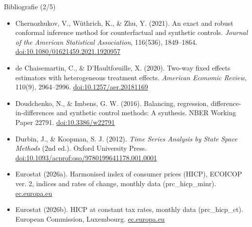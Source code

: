 \begin{frame}{Bibliografie (2/5)}
\begin{itemize}
    \item Chernozhukov, V., Wüthrich, K., \& Zhu, Y. (2021). An exact and robust conformal inference method for counterfactual and synthetic controls. \textit{Journal of the American Statistical Association}, 116(536), 1849--1864. \href{https://doi.org/10.1080/01621459.2021.1920957}{doi:10.1080/01621459.2021.1920957}
    \item de Chaisemartin, C., \& D’Haultfœuille, X. (2020). Two-way fixed effects estimators with heterogeneous treatment effects. \textit{American Economic Review}, 110(9), 2964--2996. \href{https://doi.org/10.1257/aer.20181169}{doi:10.1257/aer.20181169}
    \item Doudchenko, N., \& Imbens, G. W. (2016). Balancing, regression, difference-in-differences and synthetic control methods: A synthesis. NBER Working Paper 22791. \href{https://doi.org/10.3386/w22791}{doi:10.3386/w22791}
    \item Durbin, J., \& Koopman, S. J. (2012). \textit{Time Series Analysis by State Space Methods} (2nd ed.). Oxford University Press. \href{https://doi.org/10.1093/acprof:oso/9780199641178.001.0001}{doi:10.1093/acprof:oso/9780199641178.001.0001}
    \item Eurostat (2026a). Harmonised index of consumer prices (HICP), ECOICOP ver. 2, indices and rates of change, monthly data (prc\_hicp\_minr). \href{https://ec.europa.eu/eurostat/databrowser/view/prc_hicp_minr/default/table}{ec.europa.eu}
    \item Eurostat (2026b). HICP at constant tax rates, monthly data (prc\_hicp\_ct). European Commission, Luxembourg. \href{https://ec.europa.eu/eurostat/databrowser/view/prc_hicp_ct/default/table}{ec.europa.eu}
\end{itemize}
\end{frame}

